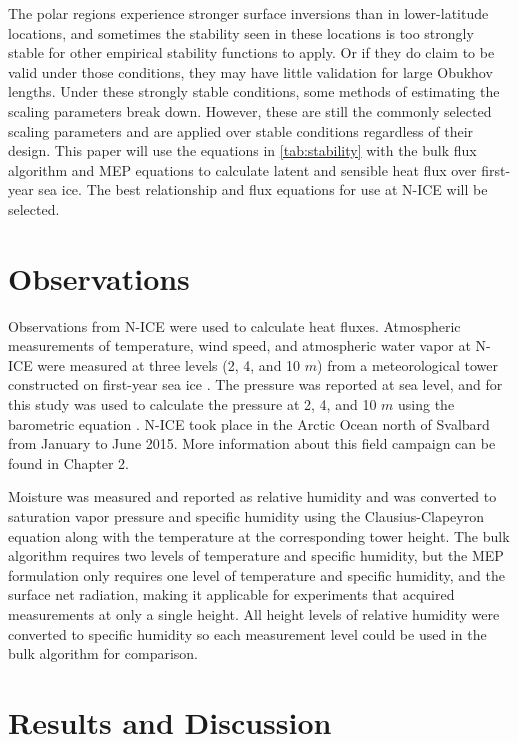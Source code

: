 The polar regions experience stronger surface inversions than in lower-latitude locations, and sometimes the stability seen in these locations is too strongly stable for other empirical stability functions to apply. Or if they do claim to be valid under those conditions, they may have little validation for large Obukhov lengths. Under these strongly stable conditions, some methods of estimating the scaling parameters break down. However, these are still the commonly selected scaling parameters and are applied over stable conditions regardless of their design. This paper will use the equations in \ref{tab:stability} with the bulk flux algorithm and MEP equations to calculate latent and sensible heat flux over first-year sea ice. The best relationship and flux equations for use at N-ICE will be selected. 

\section{Observations}
Observations from N-ICE were used to calculate heat fluxes. Atmospheric measurements of temperature, wind speed, and atmospheric water vapor at N-ICE were measured at three levels (2, 4, and 10 $m$) from a meteorological tower constructed on first-year sea ice \citep{walden:2017}. The pressure was reported at sea level, and for this study was used to calculate the pressure at 2, 4, and 10 $m$ using the barometric equation \citep{lente:2020}. N-ICE took place in the Arctic Ocean north of Svalbard from January to June 2015. More information about this field campaign can be found in Chapter 2.
 
 Moisture was measured and reported as relative humidity and was converted to saturation vapor pressure and specific humidity using the Clausius-Clapeyron equation \citep{iribarne:1981} along with the temperature at the corresponding tower height. The bulk algorithm requires two levels of temperature and specific humidity, but the MEP formulation only requires one level of temperature and specific humidity, and the surface net radiation, making it applicable for experiments that acquired measurements at only a single height. All height levels of relative humidity were converted to specific humidity so each measurement level could be used in the bulk algorithm for comparison. 

\section{Results and Discussion}
